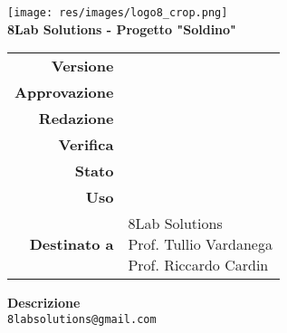 \thispagestyle{empty}
\begin{titlepage}
	\begin{center}
		\texttt{[image: res/images/logo8\_crop.png]}\\
		\large \textbf{8Lab Solutions - Progetto "Soldino"} \\
		\vfill
		\Huge \textbf{\doctitle}
		\vspace*{\fill}
        
        \vfill
        \large
        \begin{tabular}{r|l}
                        \textbf{Versione} & \rev{} \\
                        \textbf{Approvazione} & \approv{} \\
                        \textbf{Redazione} & \red{} \\
                        \textbf{Verifica} & \ver{} \\
                        \textbf{Stato} & \stato{} \\
                        \textbf{Uso} & \uso{} \\
                        \textbf{Destinato a} & \parbox[t]{5cm}{8Lab Solutions
                        \\Prof. Tullio Vardanega\\Prof. Riccardo Cardin}
                \end{tabular}
                \vfill
                \normalsize
                \textbf{Descrizione}\\
				\describedoc
                \vfill
                \small
                \texttt{8labsolutions@gmail.com}
	\end{center}
\end{titlepage}